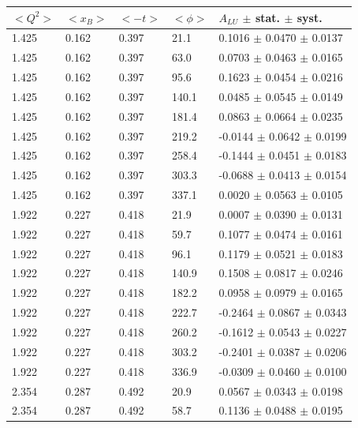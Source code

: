 \begin{table}[!h]
   \begin{center}
      \begin{tabular}{||l|l|l|l|l||}
         \hline
 $<Q^{2}>$ & $<x_{B}>$ & $<-t>$ & $<\phi>$ & $A_{LU}$ $\pm$ stat. $\pm$ syst.\\
         \hline
  1.425 & 0.162 & 0.397 & 21.1  &  0.1016 $\pm$ 0.0470 $\pm$ 0.0137 \\
  1.425 & 0.162 & 0.397 & 63.0  &  0.0703 $\pm$ 0.0463 $\pm$ 0.0165 \\
  1.425 & 0.162 & 0.397 & 95.6  &  0.1623 $\pm$ 0.0454 $\pm$ 0.0216 \\
  1.425 & 0.162 & 0.397 & 140.1 &  0.0485 $\pm$ 0.0545 $\pm$ 0.0149 \\
  1.425 & 0.162 & 0.397 & 181.4 &  0.0863 $\pm$ 0.0664 $\pm$ 0.0235 \\
  1.425 & 0.162 & 0.397 & 219.2 & -0.0144 $\pm$ 0.0642 $\pm$ 0.0199 \\
  1.425 & 0.162 & 0.397 & 258.4 & -0.1444 $\pm$ 0.0451 $\pm$ 0.0183 \\
  1.425 & 0.162 & 0.397 & 303.3 & -0.0688 $\pm$ 0.0413 $\pm$ 0.0154 \\
  1.425 & 0.162 & 0.397 & 337.1 &  0.0020 $\pm$ 0.0563 $\pm$ 0.0105 \\
  \hline                                                              
  1.922 & 0.227 & 0.418 & 21.9  &  0.0007 $\pm$ 0.0390 $\pm$ 0.0131 \\
  1.922 & 0.227 & 0.418 & 59.7  &  0.1077 $\pm$ 0.0474 $\pm$ 0.0161 \\
  1.922 & 0.227 & 0.418 & 96.1  &  0.1179 $\pm$ 0.0521 $\pm$ 0.0183 \\
  1.922 & 0.227 & 0.418 & 140.9 &  0.1508 $\pm$ 0.0817 $\pm$ 0.0246 \\
  1.922 & 0.227 & 0.418 & 182.2 &  0.0958 $\pm$ 0.0979 $\pm$ 0.0165 \\
  1.922 & 0.227 & 0.418 & 222.7 & -0.2464 $\pm$ 0.0867 $\pm$ 0.0343 \\
  1.922 & 0.227 & 0.418 & 260.2 & -0.1612 $\pm$ 0.0543 $\pm$ 0.0227 \\
  1.922 & 0.227 & 0.418 & 303.2 & -0.2401 $\pm$ 0.0387 $\pm$ 0.0206 \\
  1.922 & 0.227 & 0.418 & 336.9 & -0.0309 $\pm$ 0.0460 $\pm$ 0.0100 \\
  \hline                                                              
  2.354 & 0.287 & 0.492 & 20.9  &  0.0567 $\pm$ 0.0343 $\pm$ 0.0198 \\
  2.354 & 0.287 & 0.492 & 58.7  &  0.1136 $\pm$ 0.0488 $\pm$ 0.0195 \\

\end{tabular}
\end{center}
\end{table}
